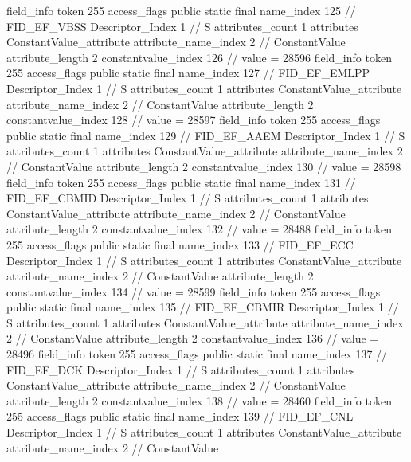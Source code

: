 {{{{{{{				}
				}
			}
			field_info {
				token	255
				access_flags	public static final
				name_index	125		// FID_EF_VBSS
				Descriptor_Index	1		// S
				attributes_count	1
				attributes {
				ConstantValue_attribute {
					attribute_name_index	2		// ConstantValue
					attribute_length	2
					constantvalue_index	126		// value = 28596
				}
				}
			}
			field_info {
				token	255
				access_flags	public static final
				name_index	127		// FID_EF_EMLPP
				Descriptor_Index	1		// S
				attributes_count	1
				attributes {
				ConstantValue_attribute {
					attribute_name_index	2		// ConstantValue
					attribute_length	2
					constantvalue_index	128		// value = 28597
				}
				}
			}
			field_info {
				token	255
				access_flags	public static final
				name_index	129		// FID_EF_AAEM
				Descriptor_Index	1		// S
				attributes_count	1
				attributes {
				ConstantValue_attribute {
					attribute_name_index	2		// ConstantValue
					attribute_length	2
					constantvalue_index	130		// value = 28598
				}
				}
			}
			field_info {
				token	255
				access_flags	public static final
				name_index	131		// FID_EF_CBMID
				Descriptor_Index	1		// S
				attributes_count	1
				attributes {
				ConstantValue_attribute {
					attribute_name_index	2		// ConstantValue
					attribute_length	2
					constantvalue_index	132		// value = 28488
				}
				}
			}
			field_info {
				token	255
				access_flags	public static final
				name_index	133		// FID_EF_ECC
				Descriptor_Index	1		// S
				attributes_count	1
				attributes {
				ConstantValue_attribute {
					attribute_name_index	2		// ConstantValue
					attribute_length	2
					constantvalue_index	134		// value = 28599
				}
				}
			}
			field_info {
				token	255
				access_flags	public static final
				name_index	135		// FID_EF_CBMIR
				Descriptor_Index	1		// S
				attributes_count	1
				attributes {
				ConstantValue_attribute {
					attribute_name_index	2		// ConstantValue
					attribute_length	2
					constantvalue_index	136		// value = 28496
				}
				}
			}
			field_info {
				token	255
				access_flags	public static final
				name_index	137		// FID_EF_DCK
				Descriptor_Index	1		// S
				attributes_count	1
				attributes {
				ConstantValue_attribute {
					attribute_name_index	2		// ConstantValue
					attribute_length	2
					constantvalue_index	138		// value = 28460
				}
				}
			}
			field_info {
				token	255
				access_flags	public static final
				name_index	139		// FID_EF_CNL
				Descriptor_Index	1		// S
				attributes_count	1
				attributes {
				ConstantValue_attribute {
					attribute_name_index	2		// ConstantValue
}}}}}}}
